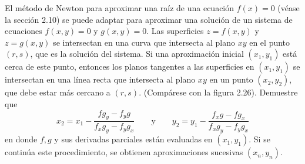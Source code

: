 \item El método de Newton para aproximar una raíz de una ecuación $f(x) = 0$ (véase la sección 2.10) se puede adaptar para aproximar una solución de un sistema de ecuaciones $f(x, y) = 0$ y $g(x, y) = 0$. Las superficies $z = f(x, y)$ y $z = g(x, y)$ se intersectan en una curva que intersecta al plano $xy$ en el punto $(r, s)$, que es la solución del sistema. Si una aproximación inicial $(x_1, y_1)$ está cerca de este punto, entonces los planos tangentes a las superficies en $(x_1, y_1)$ se intersectan en una línea recta que intersecta al plano $xy$ en un punto $(x_2, y_2)$, que debe estar más cercano a $(r, s)$. (Compárese con la figura 2.26). Demuestre que
\[ x_2 = x_1 - \frac{f g_y - f_y g}{f_x g_y - f_y g_x} \qquad \text{y} \qquad y_2 = y_1 - \frac{f_x g - f g_x}{f_x g_y - f_y g_x} \]
en donde $f, g$ y sus derivadas parciales están evaluadas en $(x_1, y_1)$. Si se continúa este procedimiento, se obtienen aproximaciones sucesivas $(x_n, y_n)$.
